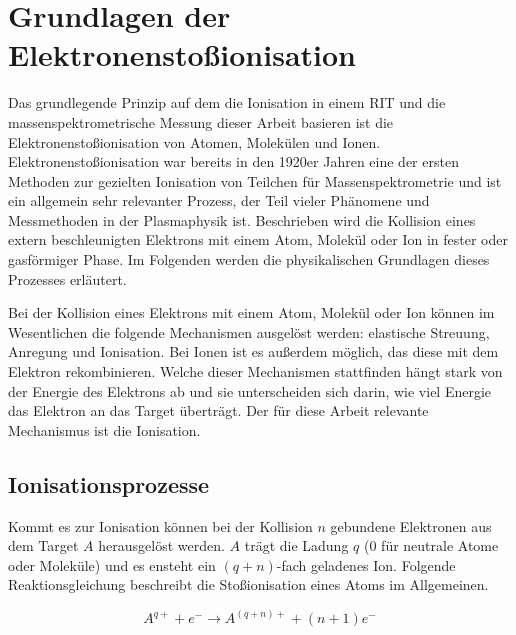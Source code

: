 \chapter{Grundlagen der Elektronenstoßionisation}
\label{chap:ion}
Das grundlegende Prinzip auf dem die Ionisation in einem RIT und die massenspektrometrische Messung dieser Arbeit basieren ist die Elektronenstoßionisation von Atomen, Molekülen und Ionen. 
Elektronenstoßionisation war bereits in den 1920er Jahren eine der ersten Methoden zur gezielten Ionisation von Teilchen für Massenspektrometrie und ist ein allgemein sehr relevanter Prozess, der Teil vieler Phänomene und Messmethoden in der Plasmaphysik ist. Beschrieben wird die Kollision eines extern beschleunigten Elektrons mit einem Atom, Molekül oder Ion in fester oder gasförmiger Phase. Im Folgenden werden die physikalischen Grundlagen dieses Prozesses erläutert. 

Bei der Kollision eines Elektrons mit einem Atom, Molekül oder Ion können im Wesentlichen die folgende Mechanismen ausgelöst werden: elastische Streuung, Anregung und Ionisation. Bei Ionen ist es außerdem möglich, das diese mit dem Elektron rekombinieren. Welche dieser Mechanismen stattfinden hängt stark von der Energie des Elektrons ab und sie unterscheiden sich darin, wie viel Energie das Elektron an das Target überträgt. Der für diese Arbeit relevante Mechanismus ist die Ionisation.

\section{Ionisationsprozesse}
Kommt es zur Ionisation können bei der Kollision $n$ gebundene Elektronen aus dem Target $A$ herausgelöst werden. $A$ trägt die Ladung $q$ (0 für neutrale Atome oder Moleküle) und es ensteht ein $(q+n)$-fach geladenes Ion. Folgende Reaktionsgleichung beschreibt die Stoßionisation eines Atoms im Allgemeinen.

\begin{equation}
     A^{q+} + e^- \rightarrow A^{(q+n)+} + (n + 1) e^-
\end{equation}

